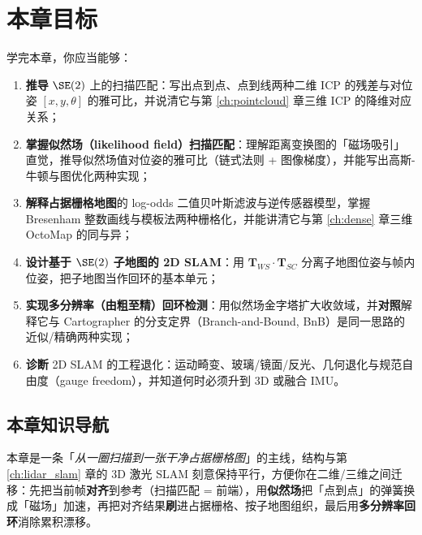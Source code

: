 \section*{本章目标}
学完本章，你应当能够：
\begin{enumerate}
  \item \textbf{推导} $\SE(2)$ 上的扫描匹配：写出点到点、点到线两种二维 ICP 的残差与对位姿 $[x,y,\theta]$ 的雅可比，并说清它与第 \cref{ch:pointcloud} 章三维 ICP 的降维对应关系；
  \item \textbf{掌握似然场（likelihood field）扫描匹配}：理解距离变换图的「磁场吸引」直觉，推导似然场值对位姿的雅可比（链式法则 + 图像梯度），并能写出高斯-牛顿与图优化两种实现；
  \item \textbf{解释占据栅格地图}的 log-odds 二值贝叶斯滤波与逆传感器模型，掌握 Bresenham 整数画线与模板法两种栅格化，并能讲清它与第 \cref{ch:dense} 章三维 OctoMap 的同与异；
  \item \textbf{设计基于 $\SE(2)$ 子地图的 2D SLAM}：用 $\mathbf{T}_{WS}\cdot\mathbf{T}_{SC}$ 分离子地图位姿与帧内位姿，把子地图当作回环的基本单元；
  \item \textbf{实现多分辨率（由粗至精）回环检测}：用似然场金字塔扩大收敛域，并\textbf{对照}解释它与 Cartographer 的分支定界（Branch-and-Bound, BnB）是同一思路的近似/精确两种实现；
  \item \textbf{诊断} 2D SLAM 的工程退化：运动畸变、玻璃/镜面/反光、几何退化与规范自由度（gauge freedom），并知道何时必须升到 3D 或融合 IMU。
\end{enumerate}

\subsection*{本章知识导航}
本章是一条「\emph{从一圈扫描到一张干净占据栅格图}」的主线，结构与第 \cref{ch:lidar_slam} 章的 3D 激光 SLAM 刻意保持平行，方便你在二维/三维之间迁移：先把当前帧\textbf{对齐}到参考（扫描匹配 = 前端），用\textbf{似然场}把「点到点」的弹簧换成「磁场」加速，再把对齐结果\textbf{刷}进占据栅格、按子地图组织，最后用\textbf{多分辨率回环}消除累积漂移。

